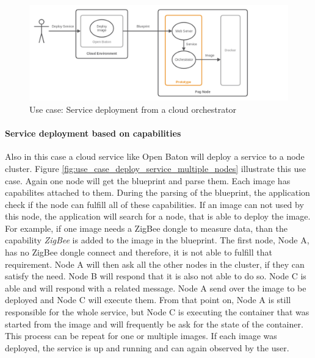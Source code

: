 \begin{figure}[H]
    \centering
    \includegraphics[width=\textwidth]{resources/images/use_case_deploy_service.png}
    \caption[Use case: Service deployment from a cloud orchestrator]{Use case: Service deployment from a cloud orchestrator}
    \label{fig:use_case_deploy_service}
\end{figure}

\paragraph{Service deployment based on capabilities}
Also in this case a cloud service like Open Baton will deploy a service to a node cluster.
Figure \ref{fig:use_case_deploy_service_multiple_nodes} illustrate this use case.
Again one node will get the blueprint and parse them.
Each image has capabilites attached to them.
During the parsing of the blueprint, the application check if the node can fulfill all of these capabilities.
If an image can not used by this node, the application will search for a node, that is able to deploy the image.
For example, if one image needs a ZigBee dongle to measure data, than the capability \textit{ZigBee} is added to the image in the blueprint.
The first node, Node A, has no ZigBee dongle connect and therefore, it is not able to fulfill that requirement.
Node A will then ask all the other nodes in the cluster, if they can satisfy the need.
Node B will respond that it is also not able to do so.
Node C is able and will respond with a related message.
Node A send over the image to be deployed and Node C will execute them.
From that point on, Node A is still responsible for the whole service, but Node C is executing the container that was started from the image and will frequently be ask for the state of the container.
This process can be repeat for one or multiple images.
If each image was deployed, the service is up and running and can again observed by the user.

